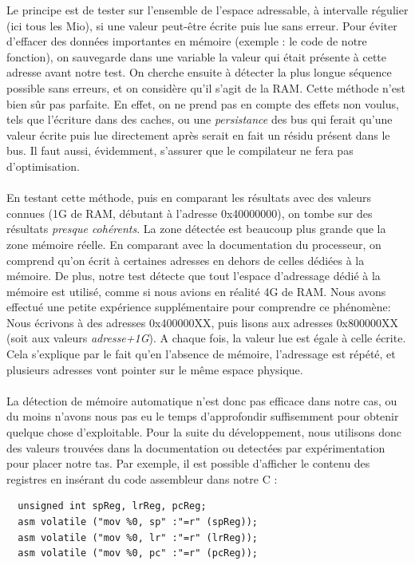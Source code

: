 \documentclass[frenchb]{article}
\begin{document}
 Le principe est de tester sur l'ensemble de l'espace adressable, à intervalle régulier (ici tous les Mio), si une valeur peut-être écrite puis lue sans erreur. Pour éviter d'effacer des données importantes en mémoire (exemple : le code de notre fonction), on sauvegarde dans une variable la valeur qui était présente à cette adresse avant notre test. On cherche ensuite à détecter la plus longue séquence possible sans erreurs, et on considère qu'il s'agit de la RAM. Cette méthode n'est bien sûr pas parfaite. En effet, on ne prend pas en compte des effets non voulus, tels que l'écriture dans des caches, ou une \textit{persistance} des bus qui ferait qu'une valeur écrite puis lue directement après serait en fait un résidu présent dans le bus. Il faut aussi, évidemment, s'assurer que le compilateur ne fera pas d'optimisation. \\ \\
En testant cette méthode, puis en comparant les résultats avec des valeurs connues (1G de RAM, débutant à l'adresse 0x40000000), on tombe sur des résultats \textit{presque cohérents}. La zone détectée est beaucoup plus grande que la zone mémoire réelle. En comparant avec la documentation du processeur, on comprend qu'on écrit à certaines adresses en dehors de celles dédiées à la mémoire. De plus, notre test détecte que tout l'espace d'adressage dédié à la mémoire est utilisé, comme si nous avions en réalité 4G de RAM. Nous avons effectué une petite expérience supplémentaire pour comprendre ce phénomène:\\
Nous écrivons à des adresses \textsf{0x400000XX}, puis lisons aux adresses \textsf{0x800000XX} (soit aux valeurs \textit{adresse+1G}). A chaque fois, la valeur lue est égale à celle écrite. Cela s'explique par le fait qu'en l'absence de mémoire, l'adressage est répété, et plusieurs adresses vont pointer sur le même espace physique.\\ \\
La détection de mémoire automatique n'est donc pas efficace dans notre cas, ou du moins n'avons nous pas eu le temps d'approfondir suffisemment pour obtenir quelque chose d'exploitable. Pour la suite du développement, nous utilisons donc des valeurs trouvées dans la documentation ou detectées par expérimentation pour placer notre tas. Par exemple, il est possible d'afficher le contenu des registres en insérant du code assembleur dans notre C :
\begin{lstlisting}
  unsigned int spReg, lrReg, pcReg;
  asm volatile ("mov %0, sp" :"=r" (spReg));
  asm volatile ("mov %0, lr" :"=r" (lrReg));
  asm volatile ("mov %0, pc" :"=r" (pcReg));
\end{lstlisting}
\end{document}
